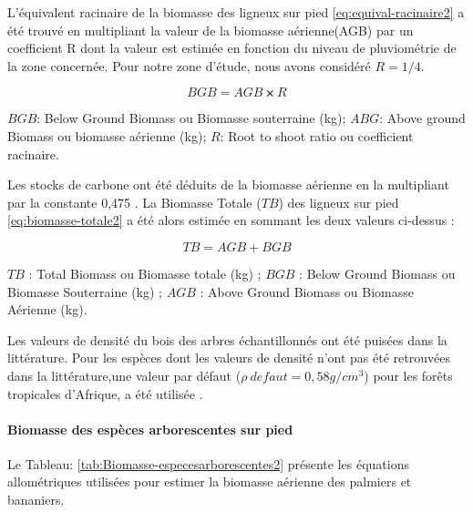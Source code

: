 \documentclass[
  12pt,
  a4paper,
  extrafontsizes,
  onecolumn,
  openright]{book}
\theoremstyle{definition}
\theoremstyle{definition}
\theoremstyle{definition}
\theoremstyle{definition}
\theoremstyle{remark}
\begin{document}
L'équivalent racinaire de la biomasse des ligneux sur pied \eqref{eq:equival-racinaire2} a été trouvé en multipliant la valeur de la biomasse aérienne(AGB) par un coefficient R dont la valeur est estimée en fonction du niveau de pluviométrie de la zone concernée\citep{GIEC2007}. Pour notre zone d'étude, nous avons considéré \(R=1/4\).

\begin{equation}
BGB=AGB⨯R 
\label{eq:equival-racinaire2}
\end{equation}

\(BGB\): Below Ground Biomass ou Biomasse souterraine (kg);
\(ABG\): Above ground Biomass ou biomasse aérienne (kg);
\(R\): Root to shoot ratio ou coefficient racinaire.

Les stocks de carbone ont été déduits de la biomasse aérienne en la multipliant par la constante 0,475 \citep{Zapfack2013}. La Biomasse Totale (\(TB\)) des ligneux sur pied \eqref{eq:biomasse-totale2} a été alors estimée en sommant les deux valeurs ci-dessus :

\begin{equation}
TB=AGB+BGB
\label{eq:biomasse-totale2}
\end{equation}

\(TB\) : Total Biomass ou Biomasse totale (kg) ;
\(BGB\) : Below Ground Biomass ou Biomasse Souterraine (kg) ;
\(AGB\) : Above Ground Biomass ou Biomasse Aérienne (kg).

Les valeurs de densité du bois des arbres échantillonnés ont été puisées dans la littérature. Pour les espèces dont les valeurs de densité n'ont pas été retrouvées dans la littérature,une valeur par défaut (\(ρ\ defaut = 0,58 g/cm^3\)) pour les forêts tropicales d'Afrique, a été utilisée \citep{Mounmemi2021}.

\hypertarget{biomasse-des-espuxe8ces-arborescentes-sur-pied}{%
\paragraph{Biomasse des espèces arborescentes sur pied}\label{biomasse-des-espuxe8ces-arborescentes-sur-pied}}

Le Tableau: \ref{tab:Biomasse-especesarborescentes2} présente les équations allométriques utilisées pour estimer la biomasse aérienne des palmiers et bananiers.
\end{document}
